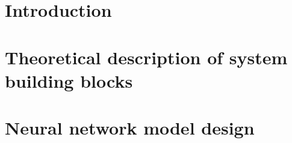 \documentclass[fleqn,a4paper,12pt]{report}
\begin{document}








%
%
%
%
%

\tableofcontents


\chapter{ Introduction}


\chapter{ Theoretical description of system building blocks}


\chapter{ Neural network model design}

\end{document}

